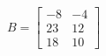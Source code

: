 \documentclass[preview]{standalone}
\begin{document}
\begin{align*}
B = \begin{bmatrix}
                        -8 & -4\\
                        23 & 12\\
                        18 & 10
                    \end{bmatrix}
\end{align*}
\end{document}
